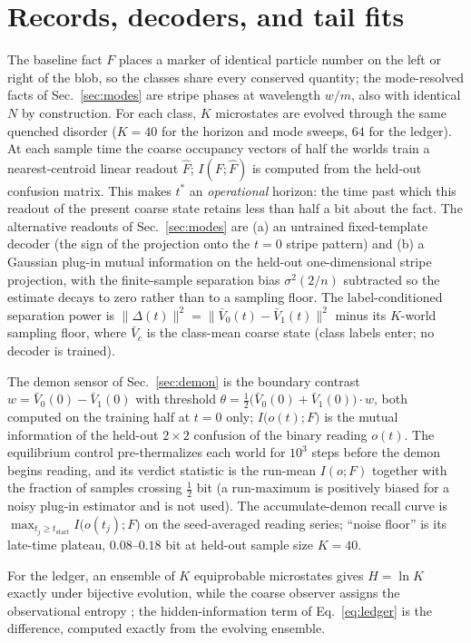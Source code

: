 \documentclass[aps,pre,twocolumn,superscriptaddress,nofootinbib,longbibliography]{revtex4-2}
\newcommand{\tstar}{t^{*}}
\begin{document}
\section{Records, decoders, and tail fits}
\label{app:decoder}

The baseline fact $F$ places a marker of identical particle number on the left or right of
the blob, so the classes share every conserved quantity; the mode-resolved facts of
Sec.~\ref{sec:modes} are stripe phases at wavelength $w/m$, also with identical $N$ by
construction. For each class, $K$ microstates are evolved through the same quenched
disorder ($K=40$ for the horizon and mode sweeps, $64$ for the ledger). At each sample time
the coarse occupancy vectors of half the worlds train a nearest-centroid linear readout
$\hat F$; $I(F;\hat F)$ is computed from the held-out confusion matrix. This makes $\tstar$
an \emph{operational} horizon: the time past which this readout of the present coarse state
retains less than half a bit about the fact. The alternative readouts of
Sec.~\ref{sec:modes} are (a) an untrained fixed-template decoder (the sign of the
projection onto the $t=0$ stripe pattern) and (b) a Gaussian plug-in mutual information on
the held-out one-dimensional stripe projection, with the finite-sample separation bias
$\sigma^2(2/n)$ subtracted so the estimate decays to zero rather than to a sampling floor.
The label-conditioned separation power is
$\|\Delta(t)\|^2=\|\bar V_0(t)-\bar V_1(t)\|^2$ minus its $K$-world sampling floor,
where $\bar V_c$ is the class-mean coarse state (class labels enter; no decoder is
trained).

The demon sensor of Sec.~\ref{sec:demon} is the boundary contrast
$w=\bar V_0(0)-\bar V_1(0)$ with threshold
$\theta=\tfrac12\bigl(\bar V_0(0)+\bar V_1(0)\bigr)\cdot w$, both computed on the training
half at $t=0$ only; $I\bigl(o(t);F\bigr)$ is the mutual information of the held-out
$2\times2$ confusion of the binary reading $o(t)$. The equilibrium control pre-thermalizes
each world for $10^3$ steps before the demon begins reading, and its verdict statistic is
the run-mean $I(o;F)$ together with the fraction of samples crossing $\tfrac12$ bit (a
run-maximum is positively biased for a noisy plug-in estimator and is not used). The
accumulate-demon recall curve is
$\max_{t_j\ge t_{\mathrm{start}}} I\bigl(o(t_j);F\bigr)$ on the seed-averaged reading
series; ``noise floor'' is its late-time plateau, $0.08$--$0.18$ bit at held-out sample
size $K=40$.

For the ledger, an ensemble of $K$ equiprobable microstates gives $H=\ln K$ exactly under
bijective evolution, while the coarse observer assigns the observational entropy
\cite{safranek2019a,safranek2021intro}; the hidden-information term of
Eq.~\eqref{eq:ledger} is the difference, computed exactly from the evolving ensemble.
\end{document}
